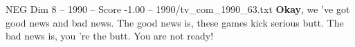 \begin{textsample}{NEG Dim 8 – 1990 – Score -1.00 – 1990/tv\_com\_1990\_63.txt}  \label{ex:f8_neg_026}
\textbf{Okay}, we 've got good news and bad news.
The good news is, these games kick serious butt.
The bad news is, you 're the butt.
You are not ready!

\end{textsample}
